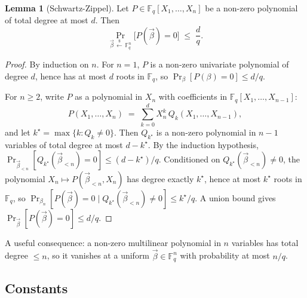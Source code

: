 \documentclass{article}
\theoremstyle{definition}
\newcommand{\Fq}{\mathbb F_q}
\newtheorem{lemma}{Lemma}
\begin{document}
\begin{lemma}[Schwartz-Zippel]\label{lem:sz}
Let $P \in \Fq[X_1, \ldots, X_n]$ be a non-zero polynomial of total degree at most $d$. Then
\[
\Pr_{\vec\beta \,\overset{\$}{\leftarrow}\, \Fq^n}\big[P(\vec\beta) = 0\big] \;\leq\; \frac{d}{q}.
\]
\end{lemma}
\begin{proof}
By induction on $n$. For $n = 1$, $P$ is a non-zero univariate polynomial of degree $d$, hence has at most $d$ roots in $\Fq$, so $\Pr_\beta[P(\beta) = 0] \leq d/q$.

For $n \geq 2$, write $P$ as a polynomial in $X_n$ with coefficients in $\Fq[X_1, \ldots, X_{n-1}]$:
\[
P(X_1, \ldots, X_n) \;=\; \sum_{k=0}^{d} X_n^k \, Q_k(X_1, \ldots, X_{n-1}),
\]
and let $k^\star = \max\{k : Q_k \neq 0\}$. Then $Q_{k^\star}$ is a non-zero polynomial in $n-1$ variables of total degree at most $d - k^\star$. By the induction hypothesis, $\Pr_{\vec\beta_{<n}}[Q_{k^\star}(\vec\beta_{<n}) = 0] \leq (d - k^\star)/q$. Conditioned on $Q_{k^\star}(\vec\beta_{<n}) \neq 0$, the polynomial $X_n \mapsto P(\vec\beta_{<n}, X_n)$ has degree exactly $k^\star$, hence at most $k^\star$ roots in $\Fq$, so $\Pr_{\beta_n}[P(\vec\beta) = 0 \mid Q_{k^\star}(\vec\beta_{<n}) \neq 0] \leq k^\star/q$. A union bound gives $\Pr_{\vec\beta}[P(\vec\beta) = 0] \leq d/q$.
\end{proof}

A useful consequence: a non-zero multilinear polynomial in $n$ variables has total degree $\leq n$, so it vanishes at a uniform $\vec\beta \in \Fq^n$ with probability at most $n/q$. 

\subsection{Constants}
\end{document}
